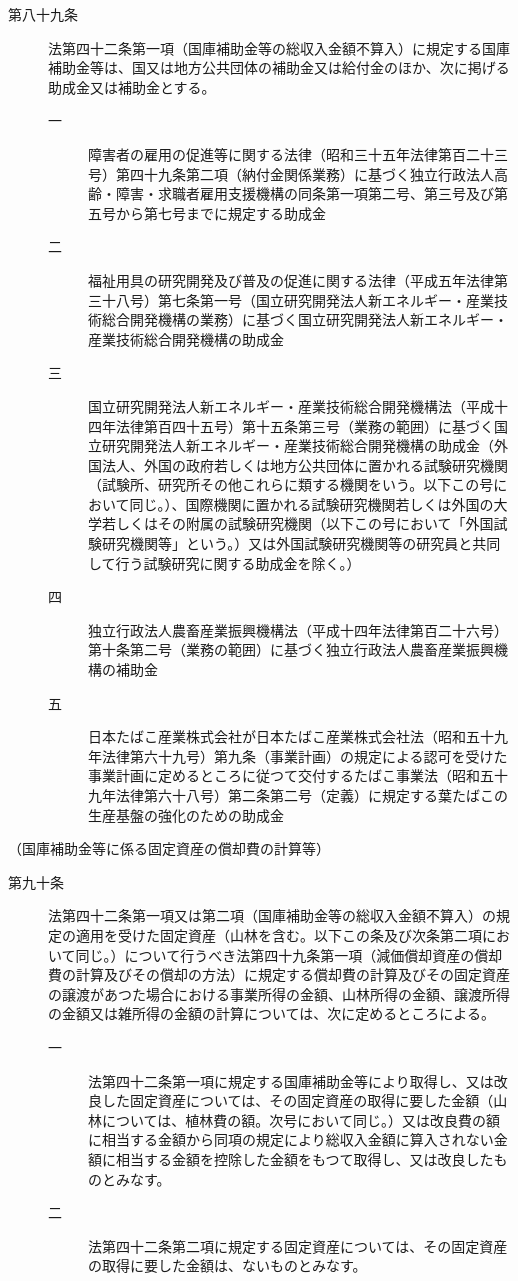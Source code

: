 \documentclass[twocolumn,a4j,10pt]{ltjtarticle}
\begin{document}
\begin{description}
\item[第八十九条]法第四十二条第一項（国庫補助金等の総収入金額不算入）に規定する国庫補助金等は、国又は地方公共団体の補助金又は給付金のほか、次に掲げる助成金又は補助金とする。
\begin{description}
\item[一]障害者の雇用の促進等に関する法律（昭和三十五年法律第百二十三号）第四十九条第二項（納付金関係業務）に基づく独立行政法人高齢・障害・求職者雇用支援機構の同条第一項第二号、第三号及び第五号から第七号までに規定する助成金
\item[二]福祉用具の研究開発及び普及の促進に関する法律（平成五年法律第三十八号）第七条第一号（国立研究開発法人新エネルギー・産業技術総合開発機構の業務）に基づく国立研究開発法人新エネルギー・産業技術総合開発機構の助成金
\item[三]国立研究開発法人新エネルギー・産業技術総合開発機構法（平成十四年法律第百四十五号）第十五条第三号（業務の範囲）に基づく国立研究開発法人新エネルギー・産業技術総合開発機構の助成金（外国法人、外国の政府若しくは地方公共団体に置かれる試験研究機関（試験所、研究所その他これらに類する機関をいう。以下この号において同じ。）、国際機関に置かれる試験研究機関若しくは外国の大学若しくはその附属の試験研究機関（以下この号において「外国試験研究機関等」という。）又は外国試験研究機関等の研究員と共同して行う試験研究に関する助成金を除く。）
\item[四]独立行政法人農畜産業振興機構法（平成十四年法律第百二十六号）第十条第二号（業務の範囲）に基づく独立行政法人農畜産業振興機構の補助金
\item[五]日本たばこ産業株式会社が日本たばこ産業株式会社法（昭和五十九年法律第六十九号）第九条（事業計画）の規定による認可を受けた事業計画に定めるところに従つて交付するたばこ事業法（昭和五十九年法律第六十八号）第二条第二号（定義）に規定する葉たばこの生産基盤の強化のための助成金
\end{description}
\end{description}
\noindent\hspace{10pt}（国庫補助金等に係る固定資産の償却費の計算等）
\begin{description}
\item[第九十条]法第四十二条第一項又は第二項（国庫補助金等の総収入金額不算入）の規定の適用を受けた固定資産（山林を含む。以下この条及び次条第二項において同じ。）について行うべき法第四十九条第一項（減価償却資産の償却費の計算及びその償却の方法）に規定する償却費の計算及びその固定資産の譲渡があつた場合における事業所得の金額、山林所得の金額、譲渡所得の金額又は雑所得の金額の計算については、次に定めるところによる。
\begin{description}
\item[一]法第四十二条第一項に規定する国庫補助金等により取得し、又は改良した固定資産については、その固定資産の取得に要した金額（山林については、植林費の額。次号において同じ。）又は改良費の額に相当する金額から同項の規定により総収入金額に算入されない金額に相当する金額を控除した金額をもつて取得し、又は改良したものとみなす。
\item[二]法第四十二条第二項に規定する固定資産については、その固定資産の取得に要した金額は、ないものとみなす。
\end{description}
\end{description}
\end{document}
